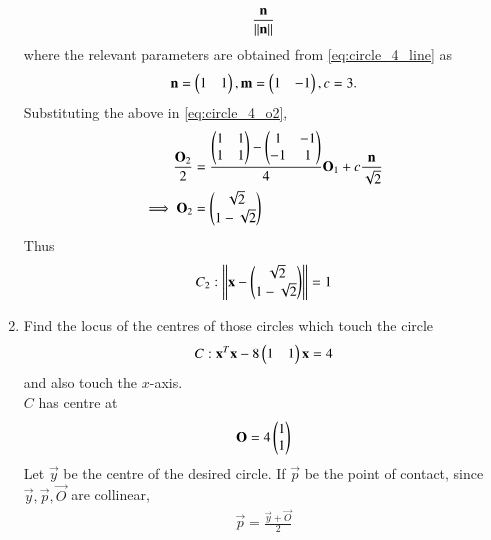 \documentclass[journal,12pt,twocolumn]{IEEEtran}
\begin{document}
\begin{enumerate}[label=\arabic*]
\begin{align}
\frac{\mathbf{n}}{\left\Vert\mathbf{n}\right\Vert}
\end{align}
%
where the relevant parameters are obtained from \eqref{eq:circle_4_line} as
\begin{align}
\mathbf{n} =  \begin{pmatrix}1 & 1\end{pmatrix}, \mathbf{m} =  \begin{pmatrix}1 & -1\end{pmatrix}, c = 3.
\end{align}
%
Substituting the above in \eqref{eq:circle_4_o2},
\begin{align}
\label{eq:circle_4_o2_final}
\frac{\mathbf{O}_2}{2} &= \frac{\begin{pmatrix}1 & 1 \\ 1 & 1\end{pmatrix}-\begin{pmatrix}1 & -1 \\ -1 & 1\end{pmatrix}}{4}\mathbf{O}_1 + c 
\frac{\mathbf{n}}{\sqrt{2}}
\nonumber \\
\implies \mathbf{O}_2 &= \begin{pmatrix}\sqrt{2} \\ 1 - \sqrt{2}\end{pmatrix}
\end{align}
%
Thus
\begin{align}
C_2: \left\Vert\mathbf{x}- \begin{pmatrix}\sqrt{2} \\ 1 - \sqrt{2}\end{pmatrix}\right\Vert = 1
\label{eq:circle_4_c2}
\end{align}

\item Find the locus of the centres of those circles which touch the circle
\begin{equation}
C:
\mathbf{x}^T\mathbf{x} -8\begin{pmatrix}1 & 1 \end{pmatrix}\mathbf{x} = 4
\label{eq:circle_5}
\end{equation}
and also touch the $x$-axis.
\\
\solution $C$ has centre at 
\begin{align}
\mathbf{O} = 4 \begin{pmatrix}1 \\ 1 \end{pmatrix} 
\label{eq:circle_5_o}
\end{align}
%
Let $\vec{y}$ be the centre of the desired circle. 
If $\vec{p}$ be the point of contact, since $\vec{y},\vec{p},\vec{O}$ are collinear, 
\begin{align}
\vec{p} = \frac{\vec{y}+\vec{O}}{2}
\label{eq:circle_5_p}
\end{align}



\end{enumerate}
\end{document}
